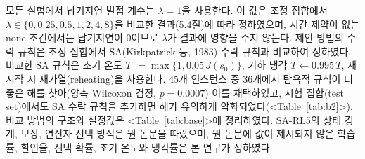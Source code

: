\documentclass[10pt,a4paper]{article}
\begin{document}
모든 실험에서 납기지연 벌점 계수는 $\lambda=1$을 사용한다. 이 값은 조정 집합에서 $\lambda\in\{0,0.25,0.5,1,2,4,8\}$을 비교한 결과(5.4절)에 따라 정하였으며, 시간 제약이 없는 none 조건에서는 납기지연이 0이므로 $\lambda$가 결과에 영향을 주지 않는다. 제안 방법의 수락 규칙은 조정 집합에서 SA(Kirkpatrick 등, 1983) 수락 규칙과 비교하여 정하였다. 비교한 SA 규칙은 초기 온도 $T_0=\max\{1,0.05\,J(s_0)\}$, 기하 냉각 $T\leftarrow0.995\,T$, 재시작 시 재가열(reheating)을 사용한다. 45개 인스턴스 중 36개에서 탐욕적 규칙이 더 좋은 해를 찾아(양측 Wilcoxon 검정, $p=0.0007$) 이를 채택하였고, 시험 집합(test set)에서도 SA 수락 규칙을 추가하면 해가 유의하게 악화되었다(<Table~\ref{tab:b2}>). 비교 방법의 구조와 설정값은 <Table~\ref{tab:base}>에 정리하였다.
SA-RL5의 상태 경계, 보상, 연산자 선택 방식은 원 논문을 따랐으며, 원 논문에 값이 제시되지 않은 학습률, 할인율, 선택 확률, 초기 온도와 냉각률은 본 연구가 정하였다.
\end{document}
